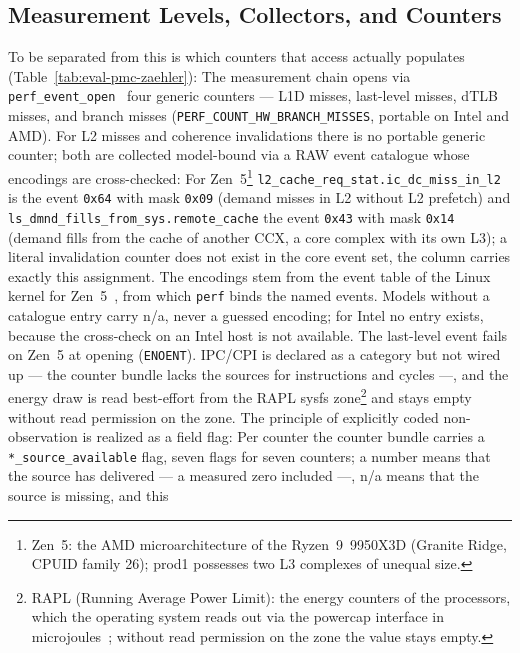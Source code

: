 \begin{nurlang}
\subsection{Measurement Levels, Collectors, and Counters}\label{sec:eval-counters}
To be separated from this is which counters that access actually populates
(Table~\ref{tab:eval-pmc-zaehler}): The measurement chain opens via
\texttt{perf\_event\_open}~\cite{linux_perf_event_open,demelo2010perf} four generic counters ---
L1D misses, last-level misses, dTLB misses, and branch misses
(\texttt{PERF\_COUNT\_HW\_BRANCH\_MISSES}, portable on Intel and AMD). For L2 misses and coherence
invalidations there is no portable generic counter; both are collected model-bound via a RAW event
catalogue whose encodings are cross-checked: For
Zen~5\footnote{Zen~5: the AMD microarchitecture of the Ryzen~9~9950X3D (Granite Ridge, CPUID family 26); %
prod1 possesses two L3 complexes of unequal size.} \texttt{l2\_cache\_req\_stat.ic\_dc\_miss\_in\_l2} is
the event \texttt{0x64} with mask \texttt{0x09} (demand misses in L2 without L2 prefetch) and %
\texttt{ls\_dmnd\_fills\_from\_sys.remote\_cache} the event \texttt{0x43} with mask \texttt{0x14} %
(demand fills from the cache of another CCX, a core complex with its own L3); a literal invalidation
counter does not exist in the core event set, the column carries exactly this assignment. The
encodings stem from the event table of the Linux kernel for Zen~5~\cite{linux_perf_amdzen5}, from
which \texttt{perf} binds the named events. Models without a catalogue entry carry n/a, never a
guessed encoding; for Intel no entry exists, because the cross-check on an Intel host is not
available. The last-level event fails on Zen~5 at opening (\texttt{ENOENT}). IPC/CPI is declared as a
category but not wired up --- the counter bundle lacks the sources for instructions and cycles ---,
and the energy draw is read best-effort from the RAPL sysfs zone\footnote{RAPL (Running Average Power
Limit): the energy counters of the processors, which the operating system reads out via the powercap
interface in microjoules~\cite{david2010rapl,khan2018rapl}; without read permission on the zone the
value stays empty.} and stays empty without read permission on the zone. The principle of explicitly
coded non-observation is realized as a field flag: Per counter the counter bundle carries a
\texttt{*\_source\_available} flag, seven flags for seven counters; a number means that the source
has delivered --- a measured zero included ---, n/a means that the source is missing, and this

\end{nurlang}
